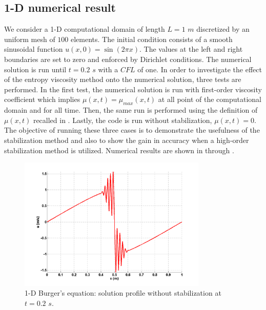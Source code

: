 \subsection{1-D numerical result}\label{sec:1dnum_sct2b}
We consider a 1-D computational domain of length $L=1$ $m$ discretized by an uniform mesh of $100$ elements. The initial condition consists of a smooth sinusoidal function $u(x,0) = \sin \left( 2 \pi x \right)$. The values at the left and right boundaries are set to zero and enforced by Dirichlet conditions. The numerical solution is run until $t=0.2$ $s$ with a $CFL$ of one. In order to investigate the effect of the entropy viscosity method onto the numerical solution, three tests are performed. In the first test, the numerical solution is run with first-order viscosity coefficient which implies $\mu(x,t) = \mu_{max}(x,t)$ at all point of the computational domain and for all time. Then, the same run is performed using the definition of $\mu(x,t)$ recalled in . Lastly, the code is run without stabilization, $\mu(x,t) = 0$. The objective of running these three cases is to demonstrate the usefulness of the stabilization method and also to show the gain in accuracy when a high-order stabilization method is utilized. Numerical results are shown in  through . 
%
\begin{figure}[H]
        \centering
        \includegraphics[width=0.8\textwidth]{figures/1D_sol_free.png}
        \caption{1-D Burger's equation: solution profile without stabilization at $t=0.2$ $s$.}
        \label{fig:1d_burger_free}
\end{figure}
%
